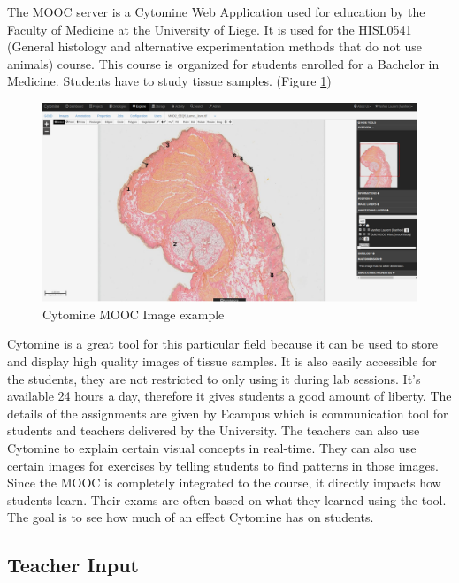 \documentclass[a4paper,11pt]{report}
\numberwithin{figure}{section} %
\begin{document}
The MOOC server is a Cytomine Web Application used for education by the Faculty of Medicine at the University of Liege.
It is used for the HISL0541 (General histology and alternative experimentation methods that do not use animals) course.
This course is organized for students enrolled for a Bachelor in Medicine.
Students have to study tissue samples. (Figure \ref{fig:lame_example})

      \begin{figure}[H]
      \centering
      \includegraphics[width=.95\linewidth]{images/lame_cytomine.png}
      \caption{Cytomine MOOC Image example}
      \label{fig:lame_example}
      \end{figure}

Cytomine is a great tool for this particular field because it can be used to store and display high quality images of tissue samples.
It is also easily accessible for the students, they are not restricted to only using it during lab sessions.
It's available 24 hours a day, therefore it gives students a good amount of liberty.
The details of the assignments are given by Ecampus which is communication tool for students and teachers delivered by the University.
The teachers can also use Cytomine to explain certain visual concepts in real-time.
They can also use certain images for exercises by telling students to find patterns in those images.\\

Since the MOOC is completely integrated to the course, it directly impacts how students learn.
Their exams are often based on what they learned using the tool.
The goal is to see how much of an effect Cytomine has on students.

\subsection{Teacher Input}
\end{document}
